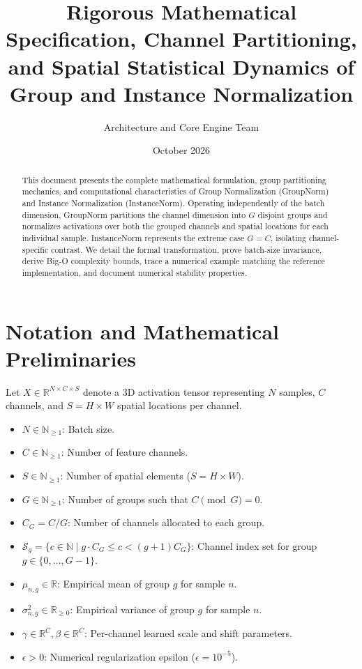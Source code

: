 \documentclass[11pt,a4paper]{article}
\title{\textbf{Rigorous Mathematical Specification, Channel Partitioning, and Spatial Statistical Dynamics of Group and Instance Normalization}}
\author{Architecture and Core Engine Team}
\date{October 2026}
\theoremstyle{definition}
\begin{document}
\maketitle

\begin{abstract}
This document presents the complete mathematical formulation, group partitioning mechanics, and computational characteristics of Group Normalization (GroupNorm) and Instance Normalization (InstanceNorm). Operating independently of the batch dimension, GroupNorm partitions the channel dimension into $G$ disjoint groups and normalizes activations over both the grouped channels and spatial locations for each individual sample. InstanceNorm represents the extreme case $G = C$, isolating channel-specific contrast. We detail the formal transformation, prove batch-size invariance, derive Big-O complexity bounds, trace a numerical example matching the reference implementation, and document numerical stability properties.
\end{abstract}

\section{Notation and Mathematical Preliminaries}

Let $X \in \mathbb{R}^{N \times C \times S}$ denote a 3D activation tensor representing $N$ samples, $C$ channels, and $S = H \times W$ spatial locations per channel.

\begin{itemize}
    \item $N \in \mathbb{N}_{\ge 1}$: Batch size.
    \item $C \in \mathbb{N}_{\ge 1}$: Number of feature channels.
    \item $S \in \mathbb{N}_{\ge 1}$: Number of spatial elements ($S = H \times W$).
    \item $G \in \mathbb{N}_{\ge 1}$: Number of groups such that $C \pmod G = 0$.
    \item $C_G = C/G$: Number of channels allocated to each group.
    \item $\mathcal{S}_g = \{c \in \mathbb{N} \mid g \cdot C_G \le c < (g+1) C_G\}$: Channel index set for group $g \in \{0, \dots, G-1\}$.
    \item $\mu_{n, g} \in \mathbb{R}$: Empirical mean of group $g$ for sample $n$.
    \item $\sigma_{n, g}^2 \in \mathbb{R}_{\ge 0}$: Empirical variance of group $g$ for sample $n$.
    \item $\gamma \in \mathbb{R}^C, \beta \in \mathbb{R}^C$: Per-channel learned scale and shift parameters.
    \item $\epsilon > 0$: Numerical regularization epsilon ($\epsilon = 10^{-5}$).
\end{itemize}
\end{document}
